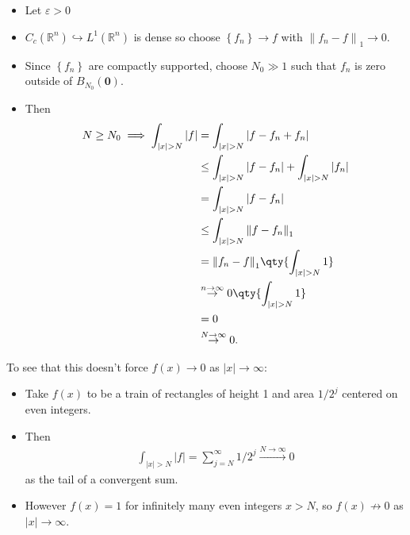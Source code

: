 \begin{solution}
\begin{itemize}
\tightlist
\item
  Let \(\varepsilon> 0\)
\item
  \(C_c({\mathbb{R}}^n) \hookrightarrow L^1({\mathbb{R}}^n)\) is dense
  so choose \(\left\{{f_n}\right\} \to f\) with
  \({\left\lVert {f_n - f} \right\rVert}_1 \to 0\).
\item
  Since \(\left\{{f_n}\right\}\) are compactly supported, choose
  \(N_0\gg 1\) such that \(f_n\) is zero outside of
  \(B_{N_0}(\mathbf{0})\).
\item
  Then
  \begin{align*}
  N\geq N_0 \implies \int_{{\left\lvert {x} \right\rvert} > N} {\left\lvert {f} \right\rvert} &= \int_{{\left\lvert {x} \right\rvert} > N} {\left\lvert {f - f_n + f_n} \right\rvert} \\
  &\leq \int_{{\left\lvert {x} \right\rvert} > N} {\left\lvert {f-f_n} \right\rvert} + \int_{{\left\lvert {x} \right\rvert} > N} {\left\lvert {f_n} \right\rvert} \\
  &= \int_{{\left\lvert {x} \right\rvert} > N} {\left\lvert {f-f_n} \right\rvert} \\ 
  &\leq \int_{{\left\lvert {x} \right\rvert} > N} {\left\lVert {f-f_n} \right\rVert}_1 \\
  &= {\left\lVert {f_n-f} \right\rVert}_1 \qty{\int_{{\left\lvert {x} \right\rvert} > N} 1} \\
  &\overset{n\to\infty}\to 0 \qty{\int_{{\left\lvert {x} \right\rvert} > N} 1} \\
  &= 0\\
  &\overset{N\to\infty}\to 0
  .\end{align*}
\end{itemize}

To see that this doesn't force \(f(x)\to 0\) as
\({\left\lvert {x} \right\rvert} \to \infty\):

\begin{itemize}
\tightlist
\item
  Take \(f(x)\) to be a train of rectangles of height 1 and area
  \(1/2^j\) centered on even integers.
\item
  Then
  \begin{align*}\int_{{\left\lvert {x} \right\rvert} > N} {\left\lvert {f} \right\rvert} = \sum_{j=N}^\infty 1/2^j \overset{N\to\infty}\to 0\end{align*}
  as the tail of a convergent sum.
\item
  However \(f(x) = 1\) for infinitely many even integers \(x > N\), so
  \(f(x) \not\to 0\) as \({\left\lvert {x} \right\rvert}\to\infty\).
\end{itemize}


\end{solution}
